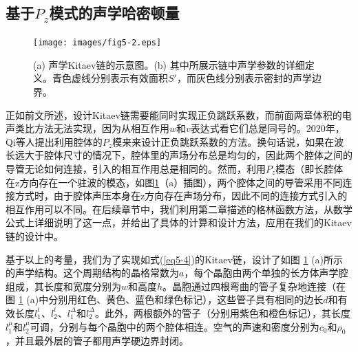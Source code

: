 \subsection{基于$P_z$模式的声学哈密顿量}

\begin{figure}[h!]
    \centering
    \texttt{[image: images/fig5-2.eps]} 
    \caption{(a) 声学Kitaev链的示意图。(b) 其中所展示链中声学参数的详细定义。青色虚线分别表示有效面积$S'$，而灰色线分别表示密封的声学边界。}
    \label{fig_5_2}
\end{figure}

正如前文所述，设计Kitaev链需要能同时实现正负跳跃系数，而前面两章体积的电声类比方法无法实现，因为从相互作用$w$和$v$表达式看它们总是同号的。2020年，Qi等人提出利用腔体的$P_z$模来来设计正负跳跃系数的方法\cite{j10}。换句话说，如果在波长远大于腔体尺寸的情况下，腔体里的声场分布总是均匀的，因此两个腔体之间的导管无论如何连接，引入的相互作用总是相同的。然而，利用$P_z$模态（即长腔体在z方向存在一个驻波的模态，如图\ref{fig_5_2}（a）插图），两个腔体之间的导管采用不同连接方式时，由于腔体声压本身在z方向存在声场分布，因此不同的连接方式引入的相互作用可以不同。在后续章节中，我们利用第二章描述的格林函数方法，从数学公式上详细说明了这一点，并给出了具体的计算和设计方法，应用在我们的Kitaev链的设计中。

基于以上的考量，我们为了实现如式(\ref{eq5-4})的Kitaev链，设计了如图 \ref{fig_5_2} (a)所示的声学结构。这个周期结构的晶格常数为\(a\)，每个晶胞由两个单独的长方体声学腔组成，其长度和宽度分别为\(w\)和高度\(h\)。晶胞通过四根弯曲的管子复杂地连接（在图 \ref{fig_5_2} (a)中分别用红色、黄色、蓝色和绿色标记），这些管子具有相同的边长\(d\)和有效长度\(l_{1}^{t}\)、\(l_{2}^{t}\)、\(l_{1}^{\Delta}\)和\(l_{2}^{\Delta}\)。此外，两根额外的管子（分别用紫色和橙色标记），其长度\(l_{1}^{\mu}\)和\(l_{2}^{\mu}\)可调，分别与每个晶胞中的两个腔体相连。空气的声速和密度分别为\(c_{0}\)和\(\rho_{0}\)，并且最外层的管子都用声学硬边界封闭。


